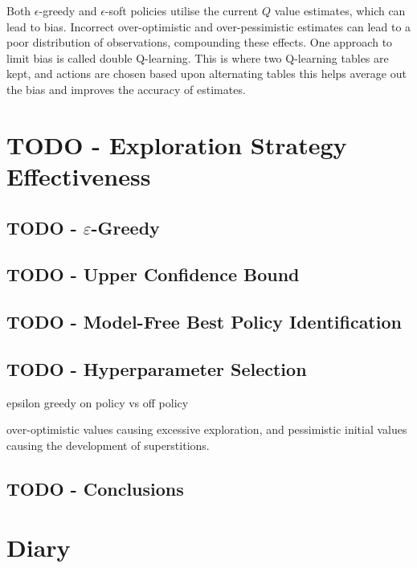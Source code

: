 \documentclass[]{final_report}
\begin{document}
Both $\epsilon$-greedy and $\epsilon$-soft policies utilise the current $Q$ value estimates, which can lead to bias. Incorrect over-optimistic and over-pessimistic estimates can lead to a poor distribution of observations, compounding these effects. One approach to limit bias is called double Q-learning. This is where two Q-learning tables are kept, and actions are chosen based upon alternating tables this helps average out the bias and improves the accuracy of estimates.

\chapter{TODO - Exploration Strategy Effectiveness}


\section{TODO - \texorpdfstring{$\varepsilon$}{Lg}-Greedy}

\section{TODO - Upper Confidence Bound}

\section{TODO - Model-Free Best Policy Identification}

\section{TODO - Hyperparameter Selection}


epsilon greedy on policy vs off policy


over-optimistic values causing excessive exploration, and pessimistic initial values causing the development of superstitions.


\section{TODO - Conclusions}




\newpage




\appendix

\chapter{Diary}





\label{endpage}
\end{document}
